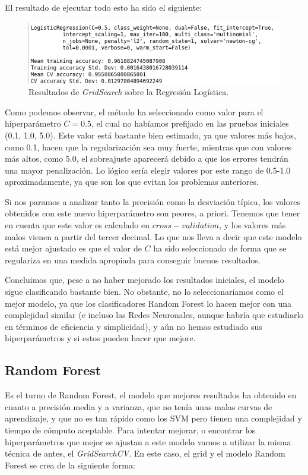 \documentclass[11pt,a4paper]{article}
\begin{document}
El resultado de ejecutar todo esto ha sido el siguiente:

\begin{figure}[H]
    \centering
    \includegraphics[scale=0.6]{img/gs-lr.png}
    \caption{Resultados de \textit{GridSearch} sobre la Regresión Logística.}
    \label{fig:gs-lr}
\end{figure}

Como podemos observar, el método ha seleccionado como valor para el hiperparámetro $C = 0.5$, el cual no habíamos prefijado en las pruebas iniciales (0.1, 1.0, 5.0). Este valor está bastante bien estimado, ya que valores más bajos, como 0.1, hacen que la regularización sea muy fuerte, mientras que con valores más altos, como 5.0, el sobreajuste aparecerá debido a que los errores tendrán una mayor penalización. Lo lógico sería elegir valores por este rango de 0.5-1.0 aproximadamente, ya que son los que evitan los problemas anteriores.

Si nos paramos a analizar tanto la precisión como la desviación típica, los valores obtenidos con este nuevo hiperparámetro son peores, a priori. Tenemos que tener en cuenta que este valor es calculado en $cross-validation$, y los valores más malos vienen a partir del tercer decimal. Lo que nos lleva a decir que este modelo está mejor ajustado es que el valor de $C$ ha sido seleccionado de forma que se regulariza en una medida apropiada para conseguir buenos resultados.

Concluimos que, pese a no haber mejorado los resultados iniciales, el modelo sigue clasificando bastante bien. No obstante, no lo seleccionaríamos como el mejor modelo, ya que los clasificadores Random Forest lo hacen mejor con una complejidad similar (e incluso las Redes Neuronales, aunque habría que estudiarlo en términos de eficiencia y simplicidad), y aún no hemos estudiado sus hiperparámetros y si estos pueden hacer que mejore.

\subsection{Random Forest}

Es el turno de Random Forest, el modelo que mejores resultados ha obtenido en cuanto a precisión media y a varianza, que no tenía unas malas curvas de aprendizaje, y que no es tan rápido como los SVM pero tienen una complejidad y tiempo de cómputo aceptable. Para intentar mejorar, o encontrar los hiperparámetros que mejor se ajustan a este modelo vamos a utilizar la misma técnica de antes, el \textit{GridSearchCV}. En este caso, el grid y el modelo Random Forest se crea de la siguiente forma:
\end{document}
